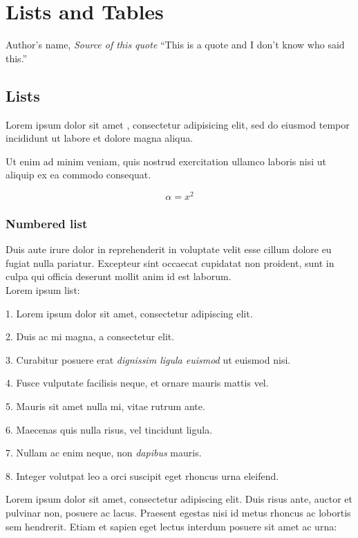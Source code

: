 \chapter{Lists and Tables}

\begin{chapquote}{Author's name, \textit{Source of this quote}}
    ``This is a quote and I don't know who said this.''
\end{chapquote}
    
\section{Lists}
Lorem ipsum dolor sit amet \citep{Ohno2007}, consectetur adipisicing elit, sed do eiusmod tempor incididunt ut labore et dolore magna aliqua.

Ut enim ad minim veniam, quis nostrud exercitation ullamco laboris nisi ut aliquip ex ea commodo consequat. 

\begin{equation}
    \alpha = x^2 \label{eq:test}
\end{equation}

\subsection{Numbered list}
 Duis aute irure dolor in reprehenderit in voluptate velit esse cillum dolore eu fugiat nulla pariatur. Excepteur sint occaecat cupidatat non proident, sunt in culpa qui officia deserunt mollit anim id est laborum. \\ Lorem ipsum list:

1. Lorem ipsum dolor sit amet, consectetur adipiscing elit.

2. Duis ac mi magna, a consectetur elit.

3. Curabitur posuere erat \emph{dignissim ligula euismod} ut euismod nisi.

4. Fusce vulputate facilisis neque, et ornare mauris mattis vel.

5. Mauris sit amet nulla mi, vitae rutrum ante.

6. Maecenas quis nulla risus, vel tincidunt ligula.

7. Nullam ac enim neque, non \emph{dapibus} mauris.

8. Integer volutpat leo a orci suscipit eget rhoncus urna eleifend.

\noindent Lorem ipsum dolor sit amet, consectetur adipiscing elit. Duis risus ante, auctor et pulvinar non, posuere ac lacus. Praesent egestas nisi id metus rhoncus ac lobortis sem hendrerit. Etiam et sapien eget lectus interdum posuere sit amet ac urna:

